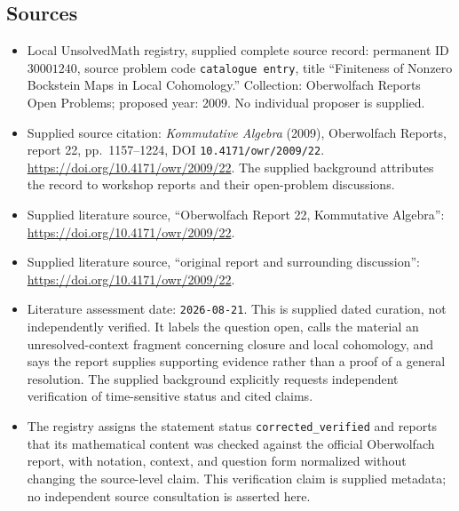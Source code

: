 \documentclass[11pt]{article}
\begin{document}
\subsection{Sources}
\begin{itemize}
\item Local UnsolvedMath registry, supplied complete source record: permanent ID \(30001240\), source problem code \texttt{catalogue entry}, title ``Finiteness of Nonzero Bockstein Maps in Local Cohomology.'' Collection: Oberwolfach Reports Open Problems; proposed year: 2009. No individual proposer is supplied.
\item Supplied source citation: \emph{Kommutative Algebra} (2009), Oberwolfach Reports, report 22, pp.~1157--1224, DOI \texttt{10.4171/owr/2009/22}. \url{https://doi.org/10.4171/owr/2009/22}. The supplied background attributes the record to workshop reports and their open-problem discussions.
\item Supplied literature source, ``Oberwolfach Report 22, Kommutative Algebra'': \url{https://doi.org/10.4171/owr/2009/22}.
\item Supplied literature source, ``original report and surrounding discussion'': \url{https://doi.org/10.4171/owr/2009/22}.
\item Literature assessment date: \texttt{2026-08-21}. This is supplied dated curation, not independently verified. It labels the question open, calls the material an unresolved-context fragment concerning closure and local cohomology, and says the report supplies supporting evidence rather than a proof of a general resolution. The supplied background explicitly requests independent verification of time-sensitive status and cited claims.
\item The registry assigns the statement status \texttt{corrected\_verified} and reports that its mathematical content was checked against the official Oberwolfach report, with notation, context, and question form normalized without changing the source-level claim. This verification claim is supplied metadata; no independent source consultation is asserted here.
\end{itemize}
\end{document}
